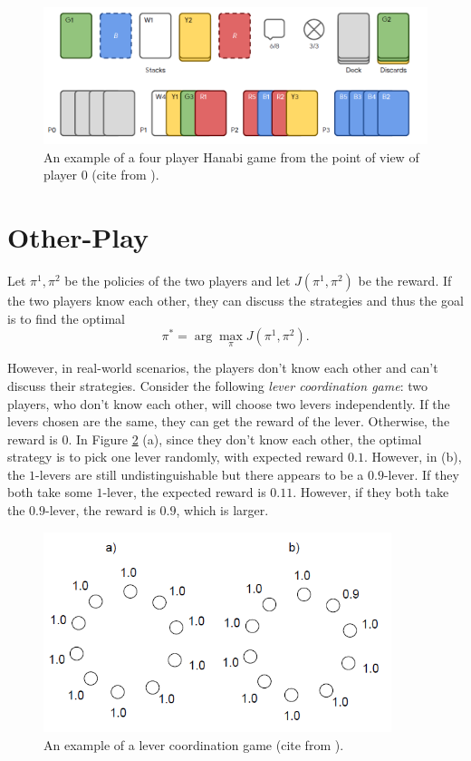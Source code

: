 \documentclass[12pt]{article}
\begin{document}
\begin{spacing}{1.15}
\begin{figure}[H]
\centerline{\includegraphics[width=6in]{fig1.png}}
\caption{An example of a four player Hanabi game from the point of view of player 0 (cite from \cite{bard2020the}).}
\label{Fig1}
\end{figure}

\section{Other-Play}
Let $\pi^1, \pi^2$ be the policies of the two players and let $J(\pi^1, \pi^2)$ be the reward. If the two players know each other, they can discuss the strategies and thus the goal is to find the optimal \[\pi^* = \arg \max_{\pi} J(\pi^1, \pi^2).\]

However, in real-world scenarios, the players don't know each other and can't discuss their strategies. Consider the following \textsl{lever coordination game}: two players, who don't know each other, will choose two levers independently. If the levers chosen are the same, they can get the reward of the lever. Otherwise, the reward is $0$. In Figure \ref{Fig2} (a), since they don't know each other, the optimal strategy is to pick one lever randomly, with expected reward $0.1$. However, in (b), the $1$-levers are still undistinguishable but there appears to be a $0.9$-lever. If they both take some $1$-lever, the expected reward is $0.11$. However, if they both take the $0.9$-lever, the reward is $0.9$, which is larger.

\begin{figure}[H]
\centerline{\includegraphics[width=4in]{fig2.png}}
\caption{An example of a lever coordination game (cite from \cite{hu2020other}).}
\label{Fig2}
\end{figure}


\end{spacing}
\end{document}

